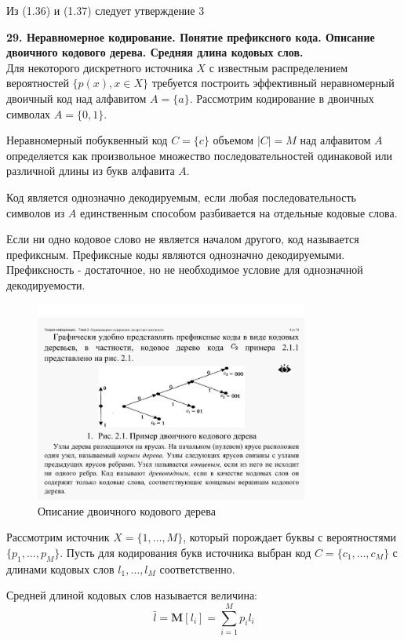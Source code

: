 \documentclass[14pt]{article}
\begin{document}
Из (1.36) и (1.37) следует утверждение 3

\bigskip
\textbf{29. Неравномерное кодирование. Понятие префиксного кода. Описание двоичного кодового дерева. Средняя длина кодовых слов.} \\

Для некоторого дискретного источника \(X\) с известным распределением вероятностей \(\{p(x), x \in X\}\) требуется построить эффективный неравномерный двоичный код над алфавитом \(A = \{a\}\). Рассмотрим кодирование в двоичных символах \(A = \{0,1\}\).

Неравномерный побуквенный код \(C = \{c\}\) объемом \(|C| = M\) над алфавитом \(A\) определяется как произвольное множество последовательностей одинаковой или различной длины из букв алфавита \(A\).

Код является однозначно декодируемым, если любая последовательность символов из \(A\) единственным способом разбивается на отдельные кодовые слова.

Если ни одно кодовое слово не является началом другого, код называется префиксным. Префиксные коды являются однозначно декодируемыми. Префиксность - достаточное, но не необходимое условие для однозначной декодируемости.

\begin{figure}[ht!]
\centering
\includegraphics[width=90mm]{code_tree.png}
\caption{Описание двоичного кодового дерева}
\end{figure}

Рассмотрим источник \(X = \{1,\ldots,M\}\), который порождает буквы с вероятностями \(\{p_1,\ldots,p_M\}\). Пусть для кодирования букв источника выбран код \(C = \{c_1,\ldots,c_M\}\) с длинами кодовых слов \(l_1,\ldots,l_M\) соответственно.

Средней длиной кодовых слов называется величина:
\begin{displaymath}
    \bar{l} = \textbf{M}[l_i] = \sum_{i=1}^{M} p_i l_i
\end{displaymath}
\end{document}
